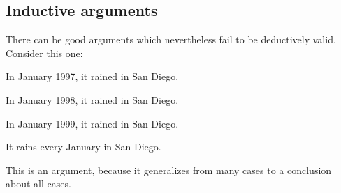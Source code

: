 






\subsection{Inductive arguments}

There can be good arguments which nevertheless fail to be deductively valid. Consider this one:

\begin{earg}
\item[] In January 1997, it rained in San Diego.
\item[] In January 1998, it rained in San Diego.
\item[] In January 1999, it rained in San Diego.
\item[\therefore] It rains every January in San Diego.
\end{earg}

This is an  argument, because it generalizes from many cases to a conclusion about all cases.

